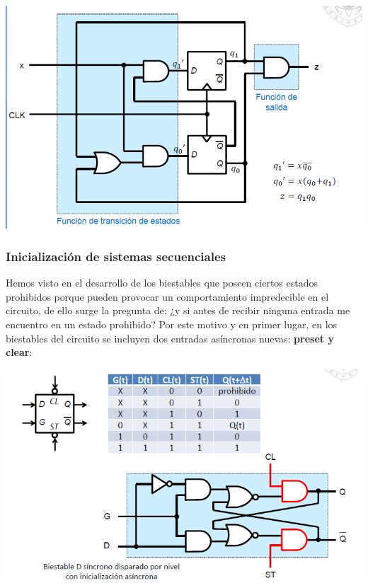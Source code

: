 \documentclass[a4paper,10pt]{book}
\begin{document}
\begin{center}
\includegraphics[scale=0.65]{Ejemplo4}
\end{center}

\subsubsection*{Inicialización de sistemas secuenciales}
Hemos visto en el desarrollo de los biestables que poseen ciertos estados prohibidos porque pueden provocar un comportamiento impredecible en el circuito, de ello surge la pregunta de: ¿y si antes de recibir ninguna entrada me encuentro en un estado prohibido?
Por este motivo y en primer lugar, en los biestables del circuito se incluyen dos entradas asíncronas nuevas: \textbf{preset y clear}:

\begin{center}
\includegraphics[scale=0.65]{Clear y preset1}
\end{center}
\end{document}
